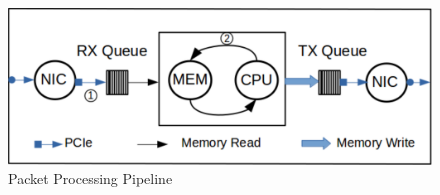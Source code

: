\begin{figure}[ht]
\includegraphics[width = \linewidth]{Figures/queuing.png}
\caption{Packet Processing Pipeline}
\label{overviewfigure}
\end{figure}
%
